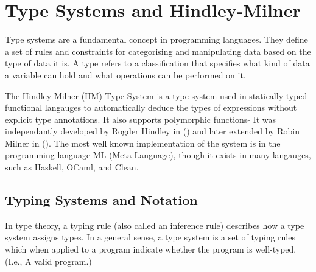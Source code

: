 \documentclass{l4proj}
\begin{document}
\section{Type Systems and Hindley-Milner}



Type systems are a fundamental concept in programming languages.
They define a set of rules and constraints for categorising and manipulating data based on the type of data it is.
A type refers to a classification that specifies what kind of data a variable can hold and what operations can be performed on it.


The Hindley-Milner (HM) Type System is a type system used in statically typed functional langauges to automatically deduce the types of expressions without explicit type annotations.
It also supports polymorphic functions 
$\tilde{}$ It was independantly developed by Rogder Hindley in () and later extended by Robin Milner in ().
The most well known implementation of the system is in the programming language ML (Meta Language), though it exists in many langauges, such as Haskell, OCaml, and Clean.

\subsection{Typing Systems and Notation}

In type theory, a typing rule (also called an inference rule) describes how a type system assigns types.
In a general sense, a type system is a set of typing rules which when applied to a program indicate whether the program is well-typed. (I.e., A valid program.)
\end{document}
